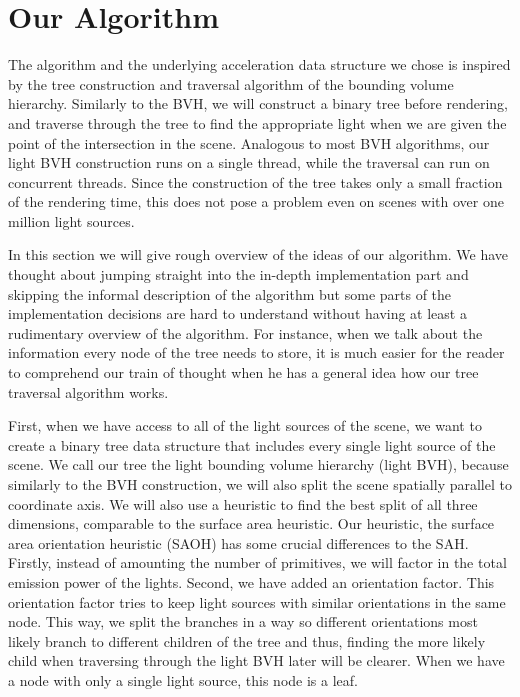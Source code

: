 
\chapter{Our Algorithm}
\label{ch:alg}

The algorithm and the underlying acceleration data structure we chose is inspired by the tree construction and traversal algorithm of the bounding volume hierarchy. Similarly to the BVH, we will construct a binary tree before rendering, and traverse through the tree to find the appropriate light when we are given the point of the intersection in the scene. Analogous to most BVH algorithms, our light BVH construction runs on a single thread, while the traversal can run on concurrent threads. Since the construction of the tree takes only a small fraction of the rendering time, this does not pose a problem even on scenes with over one million light sources.

In this section we will give rough overview of the ideas of our algorithm. We have thought about jumping straight into the in-depth implementation part and skipping the informal description of the algorithm but some parts of the implementation decisions are hard to understand without having at least a rudimentary overview of the algorithm. For instance, when we talk about the information every node of the tree needs to store, it is much easier for the reader to comprehend our train of thought when he has a general idea how our tree traversal algorithm works.

First, when we have access to all of the light sources of the scene, we want to create a binary tree data structure that includes every single light source of the scene. We call our tree the light bounding volume hierarchy (light BVH), because similarly to the BVH construction, we will also split the scene spatially parallel to coordinate axis. We will also use a heuristic to find the best split of all three dimensions, comparable to the surface area heuristic. Our heuristic, the surface area orientation heuristic (SAOH) has some crucial differences to the SAH. Firstly, instead of amounting the number of primitives, we will factor in the total emission power of the lights. Second, we have added an orientation factor. This orientation factor tries to keep light sources with similar orientations in the same node. This way, we split the branches in a way so different orientations most likely branch to different children of the tree and thus, finding the more likely child when traversing through the light BVH later will be clearer. When we have a node with only a single light source, this node is a leaf.

